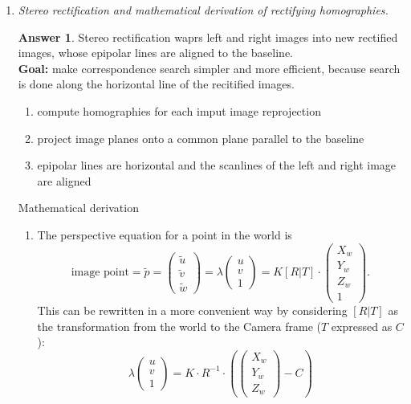 \documentclass[a4paper,12 pt]{article}
\theoremstyle{definition}
\theoremstyle{remark}
\theoremstyle{definition}
\theoremstyle{definition}
\theoremstyle{definition}
\theoremstyle{definition}
\theoremstyle{remark}
\theoremstyle{remark}
\theoremstyle{definition}
\theoremstyle{definition}
\newtheorem*{answer}{Answer}
\begin{document}
\begin{enumerate}
\item \textit{Stereo rectification and mathematical derivation of rectifying homographies.}
\begin{answer}
Stereo rectification waprs left and right images into new rectified images, whose epipolar lines are aligned to the baseline.\\
\textbf{Goal:} make correspondence search simpler and more efficient, because search is done along the horizontal line of the recitified images.
\begin{enumerate}
\item compute homographies for each imput image reprojection
\item project image planes onto a common plane parallel to the baseline
\item epipolar lines are horizontal and the scanlines of the left and right image are aligned
\end{enumerate}
Mathematical derivation 
\begin{enumerate}
\item The perspective equation for a point in the world is 
\begin{equation}
\text{image point}=\tilde{p}=\begin{pmatrix}
\tilde{u}\\
\tilde{v}\\
\tilde{w}
\end{pmatrix} = \lambda \begin{pmatrix}
 u\\
 v\\
 1
 \end{pmatrix}=K[R|T]\cdot \begin{pmatrix}
 X_w\\
 Y_w\\
 Z_w\\
 1
 \end{pmatrix}.
 \end{equation}
This can be rewritten in a more convenient way by considering $[R|T]$ as the transformation from the world to the Camera frame ($T$ expressed as $C$):
\begin{equation}
 \lambda \begin{pmatrix}
 u\\
 v\\
 1
 \end{pmatrix}=K\cdot R^{-1}\cdot \left(\begin{pmatrix}
 X_w\\
 Y_w\\
 Z_w
 \end{pmatrix}-C\right)

\end{equation}
\end{enumerate}
\end{answer}
\end{enumerate}
\end{document}
